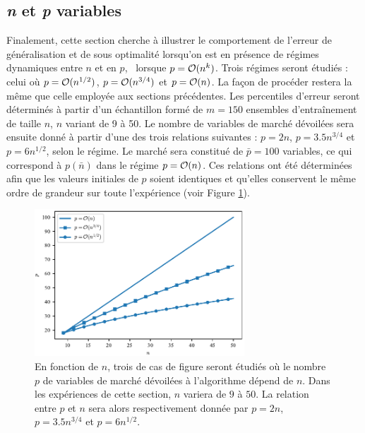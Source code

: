 \subsection{\textit{n} et \textit{p} variables}
\label{emp:npvar}

Finalement, cette section cherche à illustrer le comportement de l'erreur de
généralisation et de sous optimalité lorsqu'on est en présence de régimes dynamiques entre
$n$ et en $p$, \ie\ lorsque $p=\mathcal O(n^k)$. Trois régimes seront étudiés : celui où
$p=\mathcal O(n^{1/2})$, $p=\mathcal O(n^{3/4})$ et $p=\mathcal O(n)$. La façon de procéder restera la
même que celle employée aux sections précédentes. Les percentiles d'erreur seront
déterminés à partir d'un échantillon formé de $m=150$ ensembles d'entraînement de taille
$n$, $n$ variant de 9 à 50. Le nombre de variables de marché dévoilées sera ensuite donné
à partir d'une des trois relations suivantes : $p=2n$, $p=3.5n^{3/4}$ et $p=6n^{1/2}$,
selon le régime. Le marché sera constitué de $\bar p = 100$ variables, ce qui correspond à
$p(\bar n)$ dans le régime $p = \mathcal O(n)$. Ces relations ont été déterminées afin que les
valeurs initiales de $p$ soient identiques et qu'elles conservent le même ordre de
grandeur sur toute l'expérience (voir Figure \ref{fig_np_np}).

\begin{figure}[h]
  \centering
  \includegraphics[width=0.7\textwidth]{../experiments/fig/np_np.pdf}
  \caption[Progression des trois régimes $p=\bigO(n^{1/2}),\bigO(n^{3/4}),\bigO(n)$]{En
    fonction de $n$, trois de cas de figure seront étudiés où le nombre $p$ de variables
    de marché dévoilées à l'algorithme dépend de $n$. Dans les expériences de cette
    section, $n$ variera de $9$ à $50$. La relation entre $p$ et $n$ sera alors
    respectivement donnée par $p = 2n$, $p=3.5n^{3/4}$ et $p=6n^{1/2}$.}
  \label{fig_np_np}
\end{figure}


